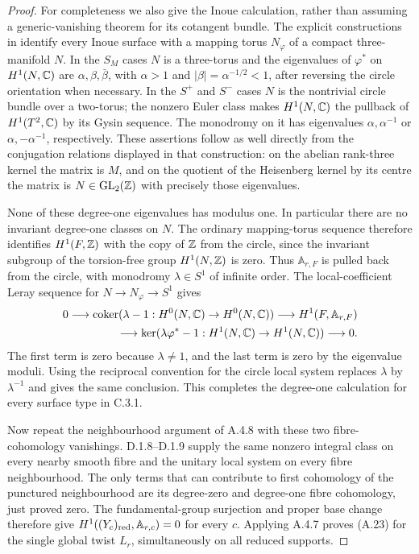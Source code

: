 \begin{proof}
For completeness we also give the Inoue calculation, rather than assuming a generic-vanishing theorem for its cotangent bundle. The explicit constructions in \cite[\S2.1.2 and Proposition~2.3]{Albanese2020} identify every Inoue surface with a mapping torus $N_\varphi$ of a compact three-manifold $N$. In the $S_M$ cases $N$ is a three-torus and the eigenvalues of $\varphi^*$ on $H^1(N,\mathbb C)$ are $\alpha,\beta,\bar\beta$, with $\alpha>1$ and $|\beta|=\alpha^{-1/2}<1$, after reversing the circle orientation when necessary. In the $S^+$ and $S^-$ cases $N$ is the nontrivial circle bundle over a two-torus; the nonzero Euler class makes $H^1(N,\mathbb C)$ the pullback of $H^1(T^2,\mathbb C)$ by its Gysin sequence. The monodromy on it has eigenvalues $\alpha,\alpha^{-1}$ or $\alpha,-\alpha^{-1}$, respectively. These assertions follow as well directly from the conjugation relations displayed in that construction: on the abelian rank-three kernel the matrix is $M$, and on the quotient of the Heisenberg kernel by its centre the matrix is $N\in\mathrm{GL}_2(\mathbb Z)$ with precisely those eigenvalues.

None of these degree-one eigenvalues has modulus one. In particular there are no invariant degree-one classes on $N$. The ordinary mapping-torus sequence therefore identifies $H^1(F,\mathbb Z)$ with the copy of $\mathbb Z$ from the circle, since the invariant subgroup of the torsion-free group $H^1(N,\mathbb Z)$ is zero. Thus $\mathbb A_{r,F}$ is pulled back from the circle, with monodromy $\lambda\in S^1$ of infinite order. The local-coefficient Leray sequence for $N\to N_\varphi\to S^1$ gives
\[
\begin{split}
0\longrightarrow
 \operatorname{coker}(\lambda-1:H^0(N,\mathbb C)\to H^0(N,\mathbb C))
 \longrightarrow H^1(F,\mathbb A_{r,F})\\
 \longrightarrow
 \ker(\lambda\varphi^*-1:H^1(N,\mathbb C)\to H^1(N,\mathbb C))
 \longrightarrow0.
\end{split}
\]
The first term is zero because $\lambda\ne1$, and the last term is zero by the eigenvalue moduli. Using the reciprocal convention for the circle local system replaces $\lambda$ by $\lambda^{-1}$ and gives the same conclusion. This completes the degree-one calculation for every surface type in C.3.1.

Now repeat the neighbourhood argument of A.4.8 with these two fibre-cohomology vanishings. D.1.8--D.1.9 supply the same nonzero integral class on every nearby smooth fibre and the unitary local system on every fibre neighbourhood. The only terms that can contribute to first cohomology of the punctured neighbourhood are its degree-zero and degree-one fibre cohomology, just proved zero. The fundamental-group surjection and proper base change therefore give $H^1((Y_c)_{\rm red},\mathbb A_{r,c})=0$ for every $c$. Applying A.4.7 proves (A.23) for the single global twist $L_r$, simultaneously on all reduced supports.


\end{proof}
